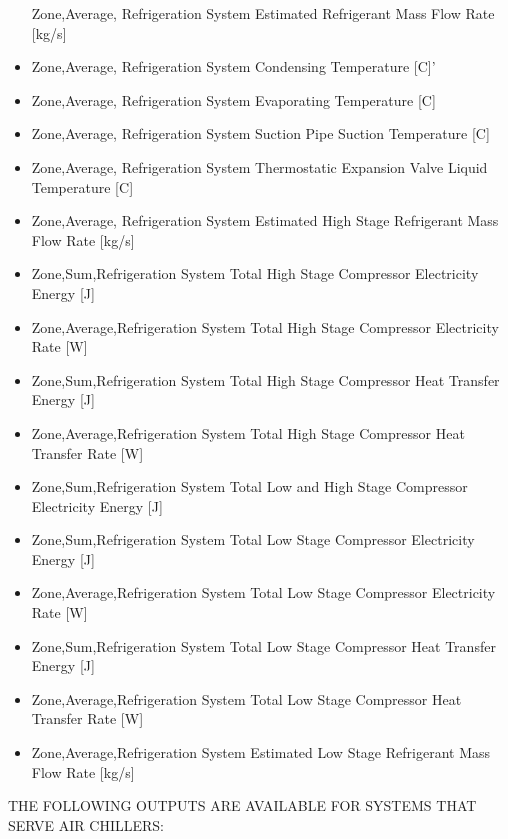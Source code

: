 \begin{itemize}
  Zone,Average, Refrigeration System Estimated Refrigerant Mass Flow Rate {[}kg/s{]}
\item
  Zone,Average, Refrigeration System Condensing Temperature {[}C{]}'
\item
  Zone,Average, Refrigeration System Evaporating Temperature {[}C{]}
\item
  Zone,Average, Refrigeration System Suction Pipe Suction Temperature {[}C{]}
\item
  Zone,Average, Refrigeration System Thermostatic Expansion Valve Liquid Temperature {[}C{]}
\item
  Zone,Average, Refrigeration System Estimated High Stage Refrigerant Mass Flow Rate {[}kg/s{]}
\item
  Zone,Sum,Refrigeration System Total High Stage Compressor Electricity Energy {[}J{]}
\item
  Zone,Average,Refrigeration System Total High Stage Compressor Electricity Rate {[}W{]}
\item
  Zone,Sum,Refrigeration System Total High Stage Compressor Heat Transfer Energy {[}J{]}
\item
  Zone,Average,Refrigeration System Total High Stage Compressor Heat Transfer Rate {[}W{]}
\item
  Zone,Sum,Refrigeration System Total Low and High Stage Compressor Electricity Energy {[}J{]}
\item
  Zone,Sum,Refrigeration System Total Low Stage Compressor Electricity Energy {[}J{]}
\item
  Zone,Average,Refrigeration System Total Low Stage Compressor Electricity Rate {[}W{]}
\item
  Zone,Sum,Refrigeration System Total Low Stage Compressor Heat Transfer Energy {[}J{]}
\item
  Zone,Average,Refrigeration System Total Low Stage Compressor Heat Transfer Rate {[}W{]}
\item
  Zone,Average,Refrigeration System Estimated Low Stage Refrigerant Mass Flow Rate {[}kg/s{]}
\end{itemize}

THE FOLLOWING OUTPUTS ARE AVAILABLE FOR SYSTEMS THAT SERVE AIR CHILLERS:

